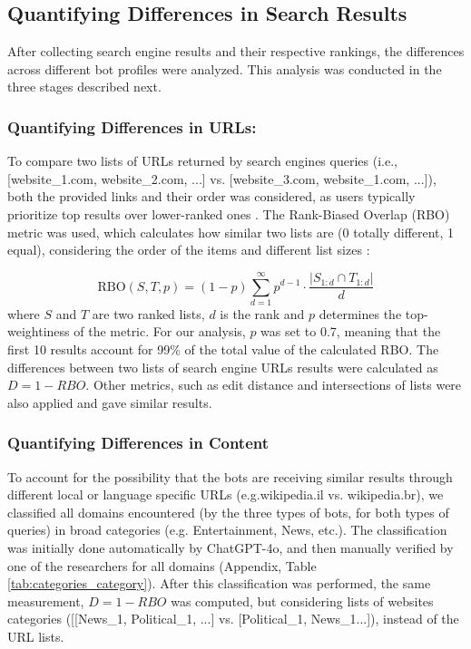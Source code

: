 
\subsection{Quantifying Differences in Search Results}

After collecting search engine results and their respective rankings, the differences across different bot profiles were analyzed. This analysis was conducted in the three stages described next.

\subsubsection{Quantifying Differences in URLs:}
To compare two lists of URLs returned by search engines queries (i.e., [website\_1.com, website\_2.com, ...] vs. [website\_3.com, website\_1.com, ...]), both the provided links and their order was considered, as users typically prioritize top results over lower-ranked ones \cite{Fay2024b}. The Rank-Biased Overlap (RBO) metric \cite{similar_measure} was used, which calculates how similar two lists are (0 totally different, 1 equal), considering the order of the items and different list sizes \cite{similar_measure}:

\[
\text{RBO}(S, T, p) = (1 - p) \sum_{d=1}^{\infty} p^{d-1} \cdot \frac{|S_{1:d} \cap T_{1:d}|}{d}
\]
where $S$ and $T$ are two ranked lists, $d$ is the rank and $p$ determines the top-weightiness of the metric. For our analysis, $p$ was set to 0.7, meaning that the first 10 results account for 99\% of the total value of the calculated RBO. The differences between two lists of search engine URLs results were calculated as $D = 1 - RBO$. Other metrics, such as edit distance and intersections of lists were also applied and gave similar results. 

\subsubsection{Quantifying Differences in Content}
To account for the possibility that the bots are receiving similar results through different local or language specific URLs (e.g.wikipedia.il vs. wikipedia.br), we classified all domains encountered (by the three types of bots, for both types of queries) in broad categories (e.g. Entertainment, News, etc.). The classification was initially done automatically by ChatGPT-4o, and then manually verified by one of the researchers for all domains (Appendix, Table \ref{tab:categories_category}).
After this classification was performed, the same measurement, $D = 1 - RBO$ was computed, but considering lists of websites categories ([[News\_1, Political\_1, ...] vs. [Political\_1, News\_1...]), instead of the URL lists. 

